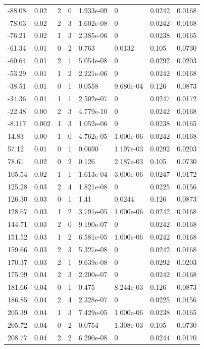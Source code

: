 \documentclass[preview]{standalone}
\begin{document}
{{\begin{tabular}{L{1.2cm}C{1.2cm} C{0.3cm}C{0.5cm} C{1.4cm}C{1.4cm} C{1.4cm}C{1.4cm}}
  -88.08  &  0.02  & 2     &  0 &  1.933e-09  & 0  & 0.0242 &  0.0168   \\ 
  -78.03  &  0.02  & 2     &  3 &  1.602e-08  & 0  & 0.0242 &  0.0168   \\ 
  -76.21  &  0.02  & 1     &  3 &  2.385e-06  & 0  & 0.0238 &  0.0165   \\ 
  -61.34  &  0.01  & 0     &  2 &  0.763  & 0.0132  & 0.105 &  0.0730   \\ 
  -60.64  &  0.01  & 2     &  1 &  5.054e-08  & 0  & 0.0292 &  0.0203   \\ 
  -53.29  &  0.01  & 1     &  2 &  2.221e-06  & 0  & 0.0242 &  0.0168   \\ 
  -38.51  &  0.01  & 0     &  1 &  0.0558  & 9.680e-04  & 0.126 &  0.0873   \\ 
  -34.36  &  0.01  & 1     &  1 &  2.502e-07  & 0  & 0.0247 &  0.0172   \\ 
  -22.48  &  0.00  & 2     &  3 &  4.779e-10  & 0  & 0.0242 &  0.0168   \\ 
  -8.117  &  0.002  & 1     &  3 &  1.052e-06  & 0  & 0.0238 &  0.0165   \\ 
  14.83  &  0.00  & 1     &  0 &  4.762e-05  & 1.000e-06  & 0.0242 &  0.0168   \\ 
  57.12  &  0.01  & 0     &  1 &  0.0690  & 1.197e-03  & 0.0292 &  0.0203   \\ 
  78.61  &  0.02  & 0     &  2 &  0.126  & 2.187e-03  & 0.105 &  0.0730   \\ 
  105.54  &  0.02  & 1     &  1 &  1.613e-04  & 3.000e-06  & 0.0247 &  0.0172   \\ 
  125.28  &  0.03  & 2     &  4 &  1.821e-08  & 0  & 0.0225 &  0.0156   \\ 
  126.30  &  0.03  & 0     &  1 &  1.41  & 0.0244  & 0.126 &  0.0873   \\ 
  128.67  &  0.03  & 1     &  2 &  3.791e-05  & 1.000e-06  & 0.0242 &  0.0168   \\ 
  144.71  &  0.03  & 2     &  0 &  9.190e-07  & 0  & 0.0242 &  0.0168   \\ 
  151.52  &  0.03  & 1     &  2 &  6.581e-05  & 1.000e-06  & 0.0242 &  0.0168   \\ 
  159.66  &  0.03  & 2     &  3 &  5.327e-08  & 0  & 0.0242 &  0.0168   \\ 
  170.37  &  0.03  & 2     &  1 &  9.639e-08  & 0  & 0.0292 &  0.0203   \\ 
  175.99  &  0.04  & 2     &  3 &  2.200e-07  & 0  & 0.0242 &  0.0168   \\ 
  181.66  &  0.04  & 0     &  1 &  0.475  & 8.244e-03  & 0.126 &  0.0873   \\ 
  186.85  &  0.04  & 2     &  4 &  2.328e-07  & 0  & 0.0225 &  0.0156   \\ 
  205.39  &  0.04  & 1     &  3 &  7.429e-05  & 1.000e-06  & 0.0238 &  0.0165   \\ 
  205.72  &  0.04  & 0     &  2 &  0.0754  & 1.308e-03  & 0.105 &  0.0730   \\ 
  208.77  &  0.04  & 2     &  2 &  6.290e-08  & 0  & 0.0244 &  0.0170   \\ 
\hline 
\end{tabular} 

}}
\end{document}
